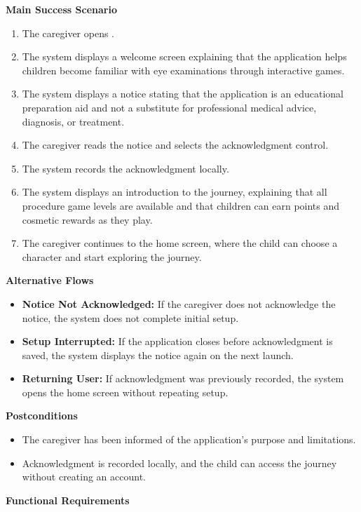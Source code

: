 \documentclass[12pt]{article}
\begin{document}
\textbf{Main Success Scenario}
\begin{enumerate}
    \item The caregiver opens \progname{}.
    \item The system displays a welcome screen explaining that the
    application helps children become familiar with eye examinations
    through interactive games.
    \item The system displays a notice stating that the application is
    an educational preparation aid and not a substitute for professional
    medical advice, diagnosis, or treatment.
    \item The caregiver reads the notice and selects the acknowledgment
    control.
    \item The system records the acknowledgment locally.
    \item The system displays an introduction to the journey, explaining
    that all procedure game levels are available and that children can
    earn points and cosmetic rewards as they play.
    \item The caregiver continues to the home screen, where the child
    can choose a character and start exploring the journey.
\end{enumerate}

\textbf{Alternative Flows}
\begin{itemize}
    \item \textbf{Notice Not Acknowledged:} If the caregiver does not
    acknowledge the notice, the system does not complete initial setup.
    \item \textbf{Setup Interrupted:} If the application closes before
    acknowledgment is saved, the system displays the notice again on
    the next launch.
    \item \textbf{Returning User:} If acknowledgment was previously
    recorded, the system opens the home screen without repeating setup.
\end{itemize}

\textbf{Postconditions}
\begin{itemize}
    \item The caregiver has been informed of the application's purpose
    and limitations.
    \item Acknowledgment is recorded locally, and the child can access
    the journey without creating an account.
\end{itemize}

\textbf{Functional Requirements}
\end{document}
